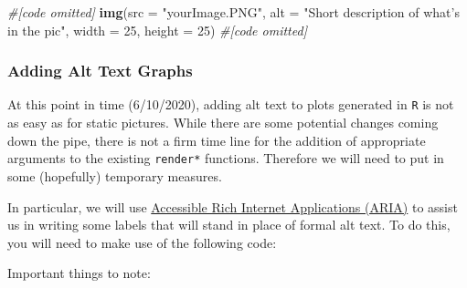 \documentclass[
]{book}
\newenvironment{Shaded}{\begin{snugshade}}{\end{snugshade}}
\newcommand{\CommentTok}[1]{\textcolor[rgb]{0.56,0.35,0.01}{\textit{#1}}}
\newcommand{\DataTypeTok}[1]{\textcolor[rgb]{0.13,0.29,0.53}{#1}}
\newcommand{\DecValTok}[1]{\textcolor[rgb]{0.00,0.00,0.81}{#1}}
\newcommand{\KeywordTok}[1]{\textcolor[rgb]{0.13,0.29,0.53}{\textbf{#1}}}
\newcommand{\NormalTok}[1]{#1}
\newcommand{\OperatorTok}[1]{\textcolor[rgb]{0.81,0.36,0.00}{\textbf{#1}}}
\newcommand{\StringTok}[1]{\textcolor[rgb]{0.31,0.60,0.02}{#1}}
\begin{document}
\begin{Shaded}
\begin{Highlighting}[]
\CommentTok{#[code omitted]}
\KeywordTok{img}\NormalTok{(}\DataTypeTok{src =} \StringTok{"yourImage.PNG"}\NormalTok{,}
    \DataTypeTok{alt =} \StringTok{"Short description of what's in the pic"}\NormalTok{,}
    \DataTypeTok{width =} \DecValTok{25}\NormalTok{, }\DataTypeTok{height =} \DecValTok{25}\NormalTok{)}
\CommentTok{#[code omitted]}
\end{Highlighting}
\end{Shaded}

\hypertarget{adding-alt-text-graphs}{%
\subsubsection{Adding Alt Text Graphs}\label{adding-alt-text-graphs}}

At this point in time (6/10/2020), adding alt text to plots generated in \texttt{R} is not as easy as for static pictures. While there are some potential changes coming down the pipe, there is not a firm time line for the addition of appropriate arguments to the existing \texttt{render*} functions. Therefore we will need to put in some (hopefully) temporary measures.

In particular, we will use \href{https://developer.mozilla.org/en-US/docs/Web/Accessibility/ARIA}{Accessible Rich Internet Applications (ARIA)} to assist us in writing some labels that will stand in place of formal alt text. To do this, you will need to make use of the following code:

\begin{Shaded}
\end{Shaded}

Important things to note:
\end{document}
